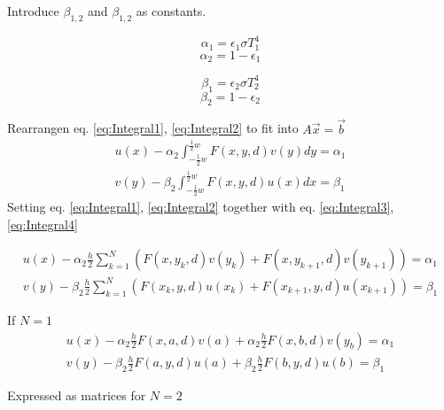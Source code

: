 \documentclass[10pt,a4paper]{article}
\begin{document}
Introduce $\beta_{1,2}$ and $\beta_{1,2}$ as constants.

\begin{multicols}{2}
  \begin{equation*}
	\alpha_{1} = \epsilon_{1}  \sigma T^{4}_ {1} 
  \end{equation*}
\break
  \begin{equation*}
  	\alpha_{2} = 1 - \epsilon_{1}
  \end{equation*}
\end{multicols}
\begin{multicols}{2}
  \begin{equation*}
  	\beta_{1} = \epsilon_{2}  \sigma T^{4}_ {2}
  \end{equation*}
\break
  \begin{equation*}
  	\beta_{2} = 1 - \epsilon_{2}
  \end{equation*}
\end{multicols}
Rearrangen eq. \ref{eq:Integral1}, \ref{eq:Integral2} to fit into $A\overrightarrow{x}=\overrightarrow{b}$
\begin{align}
u(x) - \alpha_{2}\int_{-\frac{1}{2}w}^{\frac{1}{2}w} F(x,y,d)v(y) dy = \alpha_1  \\
v(y) - \beta_{2}\int_{-\frac{1}{2}w}^{\frac{1}{2}w} F(x,y,d)u(x) dx = \beta_{1} 
\end{align}
Setting eq. \ref{eq:Integral1}, \ref{eq:Integral2} together with eq. \ref{eq:Integral3}, \ref{eq:Integral4}

\begin{align}
u(x) - \alpha_{2} \frac{h}{2} \sum_{k=1}^{N}( F(x,y_{k},d)v(y_{k}) + F(x,y_{k+1},d)v(y_{k+1})) = \alpha_{1} \\
v(y) - \beta_{2}  \frac{h}{2} \sum_{k=1}^{N}( F(x_{k},y,d)u(x_{k}) + F(x_{k+1},y,d)u(x_{k+1})) = \beta_{1}
\end{align}

If $N=1$
\begin{align}
u(x)-\alpha_{2}\frac{h}{2}F(x,a,d)v(a)+\alpha_{2}\frac{h}{2}F(x,b,d)v(y_{b}) = \alpha_{1} \\
v(y)-\beta_{2}\frac{h}{2}F(a,y,d)u(a)+\beta_{2}\frac{h}{2}F(b,y,d)u(b) = \beta_{1}
\end{align}

Expressed as matrices for $N=2$
\end{document}
